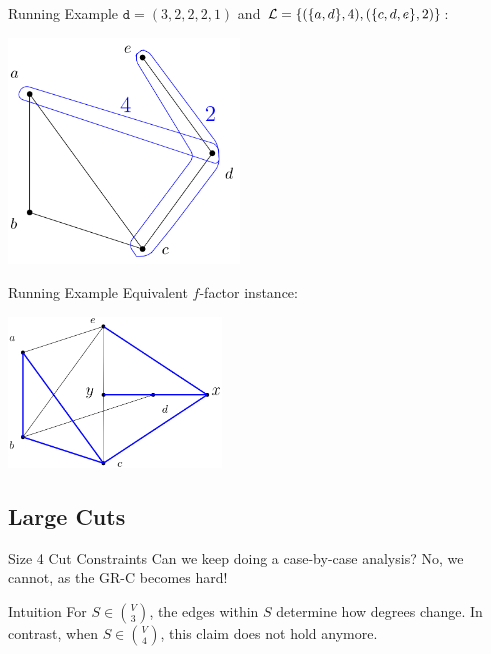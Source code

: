 \begin{frame}{Running Example}
  \centering
  $\texttt{d}=(3, 2, 2, 2, 1)$ and $\mathcal{L} = \{(\{a, d\}, 4), (\{c, d, e\}, 2)\}$:
  \bigbreak
  \begin{minipage}{\linewidth}
    \centering
    \includegraphics[height=6cm]{images/cut1.png}
  \end{minipage}
\end{frame}

\begin{frame}{Running Example}
  \centering
  Equivalent $f$-factor instance:
  \bigbreak
  \begin{minipage}{\linewidth}
    \centering
    \includegraphics[height=4cm]{images/factor1.png}
  \end{minipage}
\end{frame}

\subsection{Large Cuts}

\begin{frame}{Size 4 Cut Constraints}
    \centering
    Can we keep doing a case-by-case analysis?
    \pause
    \bigbreak
    No, we cannot, as the GR-C becomes hard!
\end{frame}

\begin{frame}{Intuition}
    \centering
    For $S \in \binom{V}{3}$, the edges within $S$ determine how degrees change.
    \pause
    \bigbreak
    In contrast, when $S \in \binom{V}{4}$, this claim does not hold anymore.
\end{frame}

